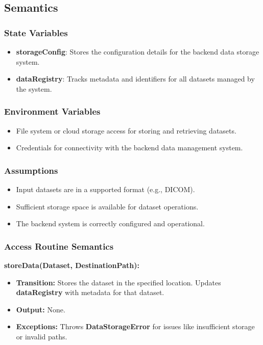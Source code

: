 \documentclass[12pt, titlepage]{article}
\begin{document}
\subsection{Semantics}

\subsubsection{State Variables}
\begin{itemize}
    \item \textbf{storageConfig}: Stores the configuration details for the backend data storage system.
    \item \textbf{dataRegistry}: Tracks metadata and identifiers for all datasets managed by the system.
\end{itemize}

\subsubsection{Environment Variables}
\begin{itemize}
    \item File system or cloud storage access for storing and retrieving datasets.
    \item Credentials for connectivity with the backend data management system.
\end{itemize}

\subsubsection{Assumptions}
\begin{itemize}
    \item Input datasets are in a supported format (e.g., DICOM).
    \item Sufficient storage space is available for dataset operations.
    \item The backend system is correctly configured and operational.
\end{itemize}

\subsubsection{Access Routine Semantics}

\noindent \textbf{storeData(Dataset, DestinationPath):}
\begin{itemize}
    \item \textbf{Transition:} Stores the dataset in the specified location. Updates \textbf{dataRegistry} with metadata for that dataset.
    \item \textbf{Output:} None.
    \item \textbf{Exceptions:} Throws \textbf{DataStorageError} for issues like insufficient storage or invalid paths.
\end{itemize}
\end{document}
